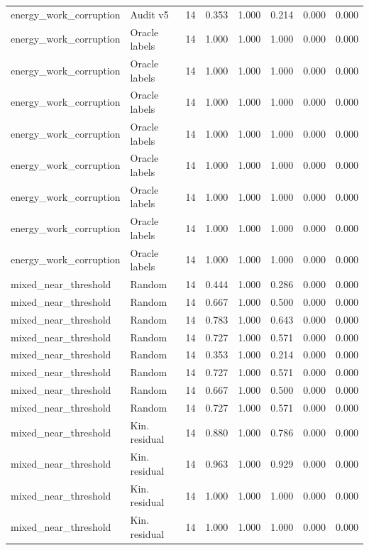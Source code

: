 {\begin{longtable}{llrrrrrr}
energy\_work\_corruption & Audit v5 & 14 & 0.353 & 1.000 & 0.214 & 0.000 & 0.000 \\
energy\_work\_corruption & Oracle labels & 14 & 1.000 & 1.000 & 1.000 & 0.000 & 0.000 \\
energy\_work\_corruption & Oracle labels & 14 & 1.000 & 1.000 & 1.000 & 0.000 & 0.000 \\
energy\_work\_corruption & Oracle labels & 14 & 1.000 & 1.000 & 1.000 & 0.000 & 0.000 \\
energy\_work\_corruption & Oracle labels & 14 & 1.000 & 1.000 & 1.000 & 0.000 & 0.000 \\
energy\_work\_corruption & Oracle labels & 14 & 1.000 & 1.000 & 1.000 & 0.000 & 0.000 \\
energy\_work\_corruption & Oracle labels & 14 & 1.000 & 1.000 & 1.000 & 0.000 & 0.000 \\
energy\_work\_corruption & Oracle labels & 14 & 1.000 & 1.000 & 1.000 & 0.000 & 0.000 \\
energy\_work\_corruption & Oracle labels & 14 & 1.000 & 1.000 & 1.000 & 0.000 & 0.000 \\
mixed\_near\_threshold & Random & 14 & 0.444 & 1.000 & 0.286 & 0.000 & 0.000 \\
mixed\_near\_threshold & Random & 14 & 0.667 & 1.000 & 0.500 & 0.000 & 0.000 \\
mixed\_near\_threshold & Random & 14 & 0.783 & 1.000 & 0.643 & 0.000 & 0.000 \\
mixed\_near\_threshold & Random & 14 & 0.727 & 1.000 & 0.571 & 0.000 & 0.000 \\
mixed\_near\_threshold & Random & 14 & 0.353 & 1.000 & 0.214 & 0.000 & 0.000 \\
mixed\_near\_threshold & Random & 14 & 0.727 & 1.000 & 0.571 & 0.000 & 0.000 \\
mixed\_near\_threshold & Random & 14 & 0.667 & 1.000 & 0.500 & 0.000 & 0.000 \\
mixed\_near\_threshold & Random & 14 & 0.727 & 1.000 & 0.571 & 0.000 & 0.000 \\
mixed\_near\_threshold & Kin. residual & 14 & 0.880 & 1.000 & 0.786 & 0.000 & 0.000 \\
mixed\_near\_threshold & Kin. residual & 14 & 0.963 & 1.000 & 0.929 & 0.000 & 0.000 \\
mixed\_near\_threshold & Kin. residual & 14 & 1.000 & 1.000 & 1.000 & 0.000 & 0.000 \\
mixed\_near\_threshold & Kin. residual & 14 & 1.000 & 1.000 & 1.000 & 0.000 & 0.000 \\

\end{longtable}}
